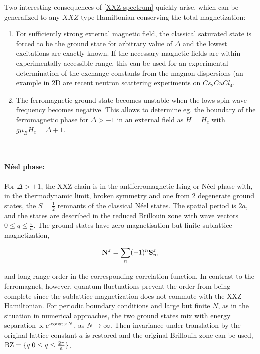 \documentclass{homework}
\begin{document}

Two interesting consequences of \cref{XXZ-spectrum} quickly arise, which can be generalized to any $XXZ$-type Hamiltonian conserving the total magnetization: 

\begin{enumerate}
    \item For sufficiently strong external magnetic field, the classical saturated state is forced to be the ground state for arbitrary value of $\Delta$ and the lowest excitations are exactly known. If the necessary magnetic fields are within experimentally accessible range, this can be used for an experimental determination of the exchange constants from the magnon dispersions (an example in 2D are recent neutron scattering experiments on $Cs_2 Cu Cl_4$. \\
    \item The ferromagnetic ground state becomes unstable when the lows spin wave frequency becomes negative. This allows to determine eg. the boundary of the ferromagnetic phase for $\Delta > -1$ in an external field as $H = H_c$ with $g \mu_B H_c = \Delta + 1$. 
\end{enumerate}

\blanky \\

\paragraph{\textbf{Néel phase:}}

For $\Delta > +1$, the XXZ-chain is in the antiferromagnetic Ising or Néel phase with, in the thermodynamic limit, broken symmetry and one from 2 degenerate ground states, the $S=\frac{1}{2}$ remnants of the classical Néel states. The spatial period is $2a$, and the states are described in the reduced Brillouin zone with wave vectors $0 \leq q \leq \frac{\pi}{a}$. The ground states have zero magnetisation but finite sublattice magnetization, 

$$
{\bf N}^z = \sum_{n} (-1)^n {\bf S}_n^z,
$$

and long range order in the corresponding correlation function. In contrast to the ferromagnet, however, quantum fluctuations prevent the order from being complete since the sublattice magnetization does not commute with the XXZ-Hamiltonian. For periodic boundary conditions and large but finite $N$, as in the situation in numerical approaches, the two ground states mix with energy separation $\propto e^{\textnormal{-const}\times N}$, as $N \rightarrow \infty$. Then invariance under translation by the original lattice constant $a$ is restored and the original Brillouin zone can be used, $\textnormal{BZ} = \{q | 0 \leq q \leq \frac{2\pi}{a}\}$. \\
\end{document}
